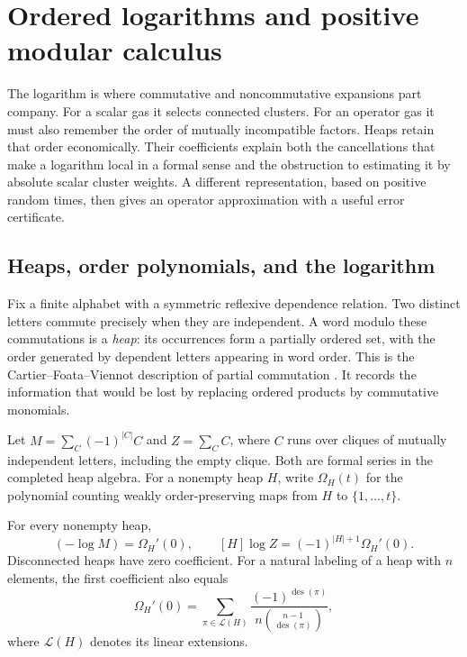 \section{Ordered logarithms and positive modular calculus}
\label{sec:positive-calculus}

The logarithm is where commutative and noncommutative expansions part company.
For a scalar gas it selects connected clusters. For an operator gas it must
also remember the order of mutually incompatible factors. Heaps retain that
order economically. Their coefficients explain both the cancellations that
make a logarithm local in a formal sense and the obstruction to estimating it
by absolute scalar cluster weights. A different representation, based on
positive random times, then gives an operator approximation with a useful
error certificate.

\subsection{Heaps, order polynomials, and the logarithm}

Fix a finite alphabet with a symmetric reflexive dependence relation. Two
distinct letters commute precisely when they are independent. A word modulo
these commutations is a \emph{heap}: its occurrences form a partially ordered
set, with the order generated by dependent letters appearing in word order.
This is the Cartier--Foata--Viennot description of partial commutation
\citep{CartierFoata1969,Viennot1986}. It records the information that would be
lost by replacing ordered products by commutative monomials.

Let $M=\sum_C(-1)^{|C|}C$ and $Z=\sum_CC$, where $C$ runs over cliques of
mutually independent letters, including the empty clique. Both are formal
series in the completed heap algebra. For a nonempty heap $H$, write
$\Omega_H(t)$ for the polynomial counting weakly order-preserving maps from
$H$ to $\{1,\ldots,t\}$.

\begin{proposition}
\label{op:heap}
For every nonempty heap,
\begin{equation}
 [H](-\log M)=\Omega_H'(0),\qquad
 [H]\log Z=(-1)^{|H|+1}\Omega_H'(0).
 \label{op:heap-coefficient}
\end{equation}
Disconnected heaps have zero coefficient. For a natural labeling of a heap
with $n$ elements, the first coefficient also equals
\begin{equation}
 \Omega_H'(0)=\sum_{\pi\in\mathcal L(H)}
 \frac{(-1)^{\operatorname{des}(\pi)}}
 {n\binom{n-1}{\operatorname{des}(\pi)}},
 \label{op:eulerian}
\end{equation}
where $\mathcal L(H)$ denotes its linear extensions.
\end{proposition}

